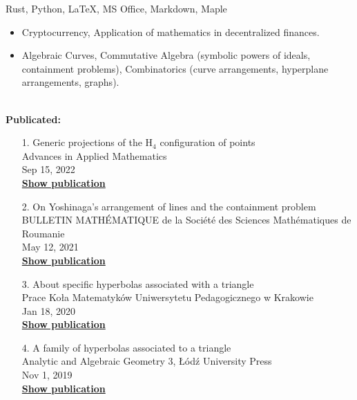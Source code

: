 \documentclass[11pt]{article}
\begin{document}
\noindent
{\bf{}}

Rust, Python, \LaTeX, MS Office, Markdown, Maple


\noindent
{\bf{}}

\begin{itemize}

    \item Cryptocurrency, Application of mathematics in decentralized finances.

    \item Algebraic Curves, Commutative Algebra (symbolic powers of ideals, containment problems), Combinatorics (curve arrangements, hyperplane arrangements, graphs).
\end{itemize}

\noindent
{\bf{}}\\
{\bf{Publicated:}}
\begin{enumerate}
    \item[1.]
          Generic projections of the $\mathrm{H}_4$ configuration of points\\
          Advances in Applied Mathematics\\
          Sep 15, 2022\\
          \href{https://www.sciencedirect.com/science/article/pii/S0196885822001166}{\textbf{Show publication}}
    \item[2.] On Yoshinaga's arrangement of lines and the containment problem\\
          BULLETIN MATHÉMATIQUE de la Société des Sciences Mathématiques de Roumanie\\
          May 12, 2021\\
          \href{https://ssmr.ro/bulletin/pdf/64-3/articol_1.pdf}{\textbf{Show publication}}
    \item[3.]
          About specific hyperbolas associated with a triangle\\
          Prace Koła Matematyków Uniwersytetu Pedagogicznego w Krakowie\\
          Jan 18, 2020\\
          \href{http://pracekm.up.krakow.pl/article/view/4997}{\textbf{Show publication}}
    \item[4.]
          A family of hyperbolas associated to a triangle\\
          Analytic and Algebraic Geometry 3, Łódź University Press\\
          Nov 1, 2019\\
          \href{https://wydawnictwo.uni.lodz.pl/produkt/analytic-and-algebraic-geometry-3/}{\textbf{Show publication}}

\end{enumerate}
\end{document}
